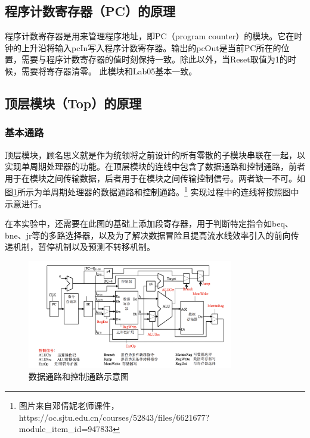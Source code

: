 \subsection{程序计数寄存器（PC）的原理}
程序计数寄存器是用来管理程序地址，即PC（program counter）的模块。它在时钟的上升沿将输入pcIn写入程序计数寄存器。输出的pcOut是当前PC所在的位置，需要与程序计数寄存器的值时刻保持一致。除此以外，当Reset取值为1的时候，需要将寄存器清零。
此模块和Lab05基本一致。

\subsection{顶层模块（Top）的原理}
\subsubsection{基本通路}
顶层模块，顾名思义就是作为统领将之前设计的所有零散的子模块串联在一起，以实现单周期处理器的功能。在顶层模块的连线中包含了数据通路和控制通路，前者用于在模块之间传输数据，后者用于在模块之间传输控制信号。两者缺一不可。如图\ref{datapath}所示为单周期处理器的数据通路和控制通路。\footnote{图片来自邓倩妮老师课件，https://oc.sjtu.edu.cn/courses/52843/files/6621677?module_item_id=947833}
实现过程中的连线将按照图中示意进行。

在本实验中，还需要在此图的基础上添加段寄存器，用于判断特定指令如beq、bne、jr等的多路选择器，以及为了解决数据冒险且提高流水线效率引入的前向传递机制，暂停机制以及预测不转移机制。
\begin{figure}[!h]
    \centering
    \includegraphics[width=0.8\textwidth]{./datapath.png}
    \caption{数据通路和控制通路示意图}
    \label{datapath}
\end{figure}


